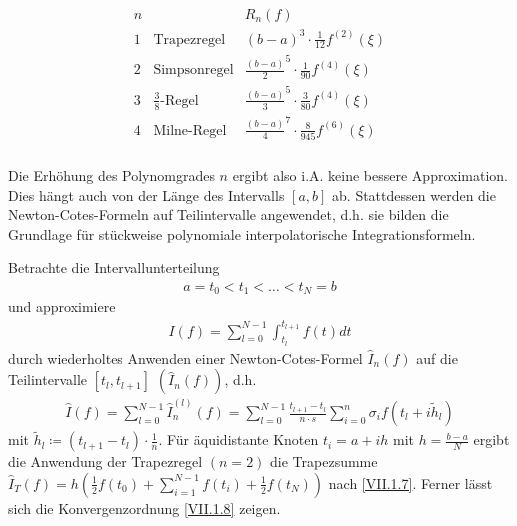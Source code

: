 \begin{gather*}\label{7.2.9}
  \begin{array}{cll}
    n & & R_n(f)\\
    1 &\text{Trapezregel} &(b-a)^3\cdot\frac{1}{12}f^{(2)}(\xi)\\
    2 &\text{Simpsonregel}&\frac{(b-a)}{2}^5\cdot\frac{1}{90}f^{(4)}(\xi)\\
    3 &\text{$\frac{3}{8}$-Regel}&\frac{(b-a)}{3}^5\cdot\frac{3}{80}f^{(4)}(\xi)\\
    4 &\text{Milne-Regel}
        &\frac{(b-a)}{4}^7\cdot\frac{8}{945}f^{(6)}(\xi)\\
  \end{array}
\end{gather*}

Die Erhöhung des Polynomgrades $n$
ergibt also
i.A. keine bessere Approximation.
Dies hängt auch von der Länge des
Intervalls $[a,b]$ ab.
Stattdessen werden die
Newton-Cotes-Formeln auf
Teilintervalle angewendet, 
d.h. sie bilden die Grundlage für
stückweise polynomiale
interpolatorische Integrationsformeln.

Betrachte die Intervallunterteilung
\begin{gather*}
  a=t_0<t_1<\ldots<t_N=b
\end{gather*}
und approximiere
\begin{gather*}
  I(f) = \sum_{l=0}^{N-1}\int_{t_l}^{t_{l+1}}f(t)dt
\end{gather*}
durch wiederholtes Anwenden einer Newton-Cotes-Formel
$\hat{I}_n(f)$ auf die Teilintervalle $[t_l, t_{l+1}]$
$(\hat{I}_n(f))$,
d.h.
\begin{gather}
  \hat{I}(f) = \sum_{l=0}^{N-1}\hat{I}_n^{(l)}(f)
  = \sum_{l=0}^{N-1}\frac{t_{l+1}-t_l}{n\cdot s}
  \sum_{i=0}^n \sigma_i f(t_l+i\widetilde{h}_l)
  \label{VII.2.11}
\end{gather}
mit $\widetilde{h}_l\coloneqq (t_{l+1}-t_l)\cdot \frac{1}{n}$.
Für äquidistante Knoten $t_i=a+ih$ mit $h=\frac{b-a}{N}$
ergibt die Anwendung der Trapezregel $(n=2)$
die Trapezsumme 
$\hat{I}_T(f) = h\left(
  \frac{1}{2}f(t_0)+\sum_{i=1}^{N-1}f(t_i) +\frac{1}{2}f(t_N)
\right)$
nach \eqref{VII.1.7}. 
Ferner lässt sich die Konvergenzordnung \eqref{VII.1.8} zeigen.


